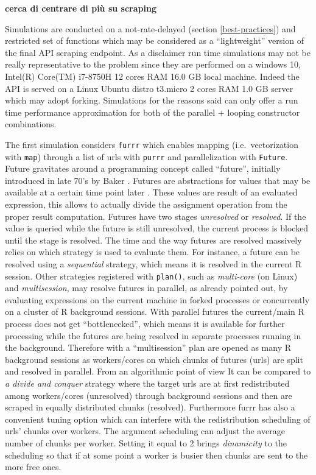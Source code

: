 \documentclass[
  12pt,
  a4paper,
  oneside]{book}
\theoremstyle{definition}
\theoremstyle{definition}
\theoremstyle{definition}
\theoremstyle{remark}
\begin{document}
\textbf{cerca di centrare di più su scraping}

Simulations are conducted on a not-rate-delayed (section \ref{best-practices}) and restricted set of functions which may be considered as a ``lightweight'' version of the final API scraping endpoint.
As a disclaimer run time simulations may not be really representative to the problem since they are performed on a windows 10, Intel(R) Core(TM) i7-8750H 12 cores RAM 16.0 GB local machine. Indeed the API is served on a Linux Ubuntu distro t3.micro 2 cores RAM 1.0 GB server which may adopt forking. Simulations for the reasons said can only offer a run time performance approximation for both of the parallel + looping constructor combinations.

The first simulation considers \texttt{furrr} which enables mapping (i.e.~vectorization with \texttt{map}) through a list of urls with \texttt{purrr} and parallelization with \texttt{Future}. Future gravitates around a programming concept called ``future'', initially introduced in late 70's by Baker \citep{BakerFuture}. Futures are abstractions for values that may be available at a certain time point later \citeyearpar{future}.
These values are result of an evaluated expression, this allows to actually divide the assignment operation from the proper result computation. Futures have two stages \emph{unresolved} or \emph{resolved}. If the value is queried while the future is still unresolved, the current process is blocked until the stage is resolved. The time and the way futures are resolved massively relies on which strategy is used to evaluate them. For instance, a future can be resolved using a \emph{sequential} strategy, which means it is resolved in the current R session. Other strategies registered with \texttt{plan()}, such as \emph{multi-core} (on Linux) and \emph{multisession}, may resolve futures in parallel, as already pointed out, by evaluating expressions on the current machine in forked processes or concurrently on a cluster of R background sessions.
With parallel futures the current/main R process does not get ``bottlenecked'', which means it is available for further processing while the futures are being resolved in separate processes running in the background. Therefore with a ``multisession'' plan are opened as many R background sessions as workers/cores on which chunks of futures (urls) are split and resolved in parallel. From an algorithmic point of view It can be compared to \emph{a divide and conquer} strategy where the target urls are at first redistributed among workers/cores (unresolved) through background sessions and then are scraped in equally distributed chunks (resolved).
Furthermore furrr has also a convenient tuning option which can interfere with the redistribution scheduling of urls' chunks over workers. The argument scheduling can adjust the average number of chunks per worker. Setting it equal to 2 brings \emph{dinamicity} \citeyearpar{furrr} to the scheduling so that if at some point a worker is busier then chunks are sent to the more free ones.
\end{document}
